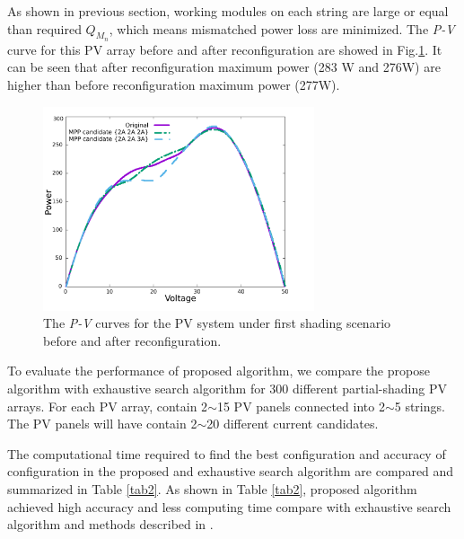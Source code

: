 \documentclass[conference]{IEEEtran}
\begin{document}
As shown in previous section, working modules on each string are large or equal than required \textit{$Q_{M_n}$}, which means mismatched power loss are minimized. The \textit{P-V} curve for this PV array before and after reconfiguration are showed in Fig.\ref{fig6}. It can be seen that after reconfiguration maximum power (283 W and 276W) are higher than before reconfiguration maximum power (277W).

\begin{figure}[htbp]
\centerline{\includegraphics[width=8cm]{zhao.pdf}}
\caption{The \textit{P-V} curves for the PV system under first shading scenario before and after reconfiguration.}
\label{fig6}
\end{figure}

To evaluate the performance of proposed algorithm, we compare the propose algorithm with exhaustive search algorithm for 300 different partial-shading PV arrays. For each PV array, contain 2$\sim$15 PV panels connected into 2$\sim$5 strings. The PV panels will have contain 2$\sim$20 different current candidates. 



The computational time required to find the best configuration and accuracy of configuration in the proposed and exhaustive search algorithm are compared and summarized in Table \ref{tab2}. As shown in Table \ref{tab2}, proposed algorithm achieved high accuracy and less computing time compare with exhaustive search algorithm and methods described in \cite{b10}. %
\end{document}
